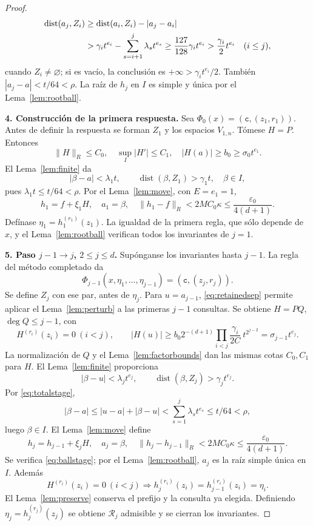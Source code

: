 \documentclass[11pt,a4paper]{article}
\numberwithin{equation}{section}
\theoremstyle{definition}
\theoremstyle{remark}
\newcommand{\Rec}{\mathcal R}
\newcommand{\ct}{\mathtt c}
\DeclareMathOperator{\dist}{dist}
\newcommand{\paso}[1]{\par\smallskip\noindent\textbf{#1}\quad}
\begin{document}
\begin{proof}
\begin{equation}
\end{equation}
\begin{align}
\dist(a_j,Z_i)
&\ge\dist(a_i,Z_i)-|a_j-a_i|\notag\\
&>\gamma_it^{e_i}-\sum_{s=i+1}^{j}\lambda_st^{e_s}
\ge\frac{127}{128}\gamma_it^{e_i}
>\frac{\gamma_i}{2}t^{e_i}\quad(i\le j),\label{eq:retainedsep}
\end{align}
cuando $Z_i\ne\varnothing$; si es vacío, la conclusión es $+\infty>\gamma_it^{e_i}/2$. También $|a_j-a|<t/64<\rho$. La raíz de $h_j$ en $I$ es simple y única por el Lema~\ref{lem:rootball}.
\paso{4. Construcción de la primera respuesta.}
Sea $\Phi_0(x)=(\ct,(z_1,r_1))$. Antes de definir la respuesta se forman $Z_1$ y los espacios $V_{1,n}$. Tómese $H=P$. Entonces
\[
\|H\|_R\le C_0,\quad\sup_I|H'|\le C_1,\quad
|H(a)|\ge b_0\ge\sigma_0t^{e_1}.
\]
El Lema~\ref{lem:finite} da
\[
|\beta-a|<\lambda_1t,\qquad\dist(\beta,Z_1)>\gamma_1t,
\quad\beta\in I,
\]
pues $\lambda_1t\le t/64<\rho$. Por el Lema~\ref{lem:move}, con $E=e_1=1$,
\[
h_1=f+\xi_1H,\quad a_1=\beta,\quad
\|h_1-f\|_R<2MC_0\kappa\le\frac{\varepsilon_0}{4(d+1)}.
\]
Defínase $\eta_1=h_1^{(r_1)}(z_1)$. La igualdad de la primera regla, que sólo depende de $x$, y el Lema~\ref{lem:rootball} verifican todos los invariantes de $j=1$.
\paso{5. Paso $j-1\to j$, $2\le j\le d$.}
Supónganse los invariantes hasta $j-1$. La regla del método completado da
\[
\Phi_{j-1}(x,\eta_1,\ldots,\eta_{j-1})=(\ct,(z_j,r_j)).
\]
Se define $Z_j$ con ese par, antes de $\eta_j$. Para $u=a_{j-1}$, \eqref{eq:retainedsep} permite aplicar el Lema~\ref{lem:perturb} a las primeras $j-1$ consultas. Se obtiene $H=PQ$, $\deg Q\le j-1$, con
\[
H^{(r_i)}(z_i)=0\ (i<j),\qquad
|H(u)|\ge b_0 2^{-(d+1)}\prod_{i<j}\frac{\gamma_i}{2C}\ t^{2^{j-2}}
=\sigma_{j-1}t^{e_j}.
\]
La normalización de $Q$ y el Lema~\ref{lem:factorbounds} dan las mismas cotas $C_0,C_1$ para $H$. El Lema~\ref{lem:finite} proporciona
\[
|\beta-u|<\lambda_jt^{e_j},\qquad
\dist(\beta,Z_j)>\gamma_jt^{e_j}.
\]
Por \eqref{eq:totalstage},
\[
|\beta-a|\le|u-a|+|\beta-u|
<\sum_{s=1}^j\lambda_st^{e_s}\le t/64<\rho,
\]
luego $\beta\in I$. El Lema~\ref{lem:move} define
\[
h_j=h_{j-1}+\xi_jH,\quad a_j=\beta,\quad
\|h_j-h_{j-1}\|_R<2MC_0\kappa\le\frac{\varepsilon_0}{4(d+1)}.
\]
Se verifica \eqref{eq:ballstage}; por el Lema~\ref{lem:rootball}, $a_j$ es la raíz simple única en $I$. Además
\[
H^{(r_i)}(z_i)=0\ (i<j)
\Longrightarrow h_j^{(r_i)}(z_i)=h_{j-1}^{(r_i)}(z_i)=\eta_i.
\]
El Lema~\ref{lem:preserve} conserva el prefijo y la consulta ya elegida. Definiendo $\eta_j=h_j^{(r_j)}(z_j)$ se obtiene $\Rec_j$ admisible y se cierran los invariantes.

\end{proof}
\end{document}
